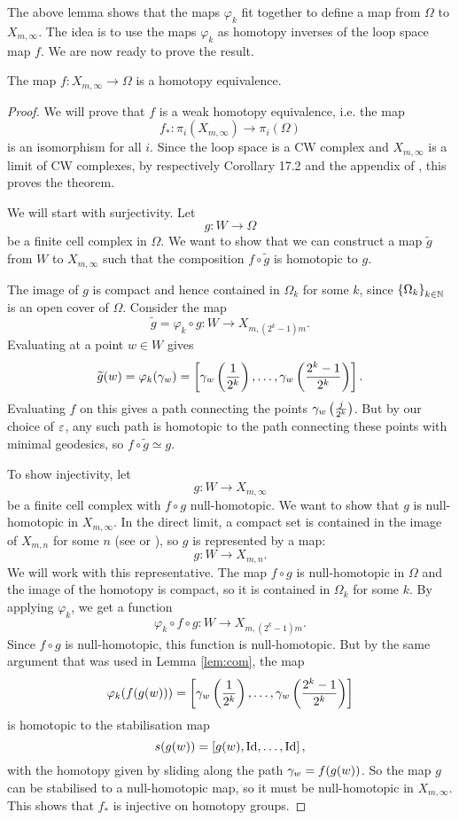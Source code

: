 The above lemma shows that the maps $\varphi_k$ fit together to define
a map from $\Omega$ to $X_{m,\infty}$.
The idea is to use the maps $\varphi_k$ as homotopy inverses of the
loop space map $f$. We are now ready to prove the result.

\begin{theorem}
  \label{thm:loekker}
  The map $f : X_{m,\infty} \to \Omega$ is a homotopy
  equivalence.
\end{theorem}

\begin{proof}
  We will prove that $f$ is a weak homotopy equivalence, i.e. the map
  \[f_* : \pi_i(X_{m,\infty}) \to \pi_i(\Omega)\]
  is an isomorphism for all $i$. Since the
  loop space is a CW complex and $X_{m,\infty}$ is a limit of CW
  complexes, by respectively Corollary 17.2 and the appendix of
  \cite{milnor}, this proves the theorem.
  
  We will start with surjectivity. Let
  \[ g : W \to \Omega \]
  be a finite cell complex in $\Omega$. We want to show that we can
  construct a map $\widetilde g$ from $W$ to $X_{m,\infty}$ such that
  the composition $f\circ \widetilde g$ is homotopic to $g$.
  
  The image of $g$ is compact and hence contained in $\Omega_k$ for
  some $k$, since $\left\{ \Omega_k \right\}_{k\in\mathbb{N}}$ is an open cover of
  $\Omega$. Consider the map 
  \[ \widetilde g = \varphi_k\circ g : W \to X_{m,(2^k-1)m}. \]
  Evaluating at a point $w\in W$ gives
  \[ \widetilde g(w) = \varphi_k(\gamma_w) = \left[
    \gamma_w\left(\frac{1}{2^k}\right),\dots,
    \gamma_w\left(\frac{2^k-1}{2^k}\right) \right]. \]
  Evaluating $f$ on this gives a path connecting the points
  $\gamma_w\left(\frac{j}{2^k}\right)$. But by our choice of $\varepsilon$, any
  such path is homotopic to the path connecting these points with
  minimal geodesics, so $f\circ\widetilde g \simeq g$.

  To show injectivity, let
  \[ g : W \to X_{m,\infty}\]
  be a finite cell complex with $f\circ g$ null-homotopic. We want to
  show that $g$ is null-homotopic in $X_{m,\infty}$. In the
  direct limit, a compact set is contained in the image of $X_{m,n}$
  for some $n$ (see \cite[Proposition~A.1]{hatcher} or
  \cite[Chapter~9.4]{may}), so $g$ is represented by a map:
  \[ g : W \to X_{m,n}. \]
  We will work with this representative. The map $f\circ
  g$ is null-homotopic in $\Omega$ and the image of the homotopy is
  compact, so it is
  contained in $\Omega_k$ for some $k$. By applying $\varphi_k$, we
  get a function
  \[ \varphi_k\circ f\circ g : W \to X_{m,(2^k-1)m}. \]
  Since $f\circ g$ is null-homotopic, this function is
  null-homotopic. But by the same argument that was used in
  Lemma \ref{lem:com}, the map
  \[ \varphi_k(f(g(w))) = \left[
    \gamma_w\left(\frac{1}{2^k}\right),\dots,\gamma_w\left(\frac{2^k-1}{2^k}
    \right)\right] \] 
  is homotopic to the stabilisation map
  \[ s(g(w)) = \left[g(w),\operatorname{Id},\dots,\operatorname{Id}\right], \]
  with the homotopy given by sliding along the path $\gamma_w=f(g(w))$.
  So the map $g$ can be stabilised to a null-homotopic map, so it must
  be null-homotopic in $X_{m,\infty}$. This shows that $f_*$ is
  injective on homotopy groups.
\end{proof}

